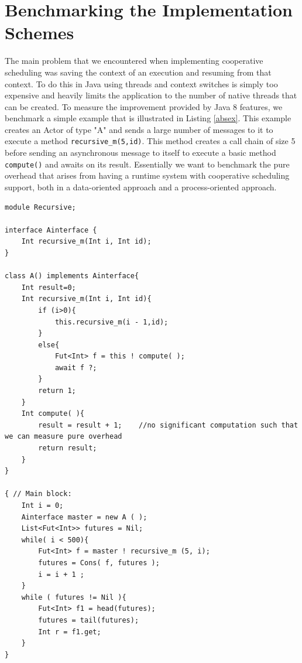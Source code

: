 \section{Benchmarking the Implementation Schemes}
\label{bench}
The main problem that we encountered when implementing cooperative scheduling was saving the context of an execution and resuming from that context. To do this in Java using threads and context switches is simply too expensive and heavily limits the application to the number of native threads that can be created. To measure the improvement provided by Java 8 features, we benchmark a simple example that is illustrated in Listing \ref{absex}. This example creates an Actor of type "A" and sends a large number of messages to it to execute a method \lstinline|recursive_m(5,id)|. This method creates a call chain of size 5 before sending an asynchronous message to itself to execute a basic method \lstinline|compute()| and awaits on its result. Essentially we want to benchmark the pure overhead that arises from having a runtime system with cooperative scheduling support, both in a data-oriented approach and a process-oriented approach.




\begin{lstlisting}[caption= ABS Example, label=absex]
module Recursive;

interface Ainterface {
	Int recursive_m(Int i, Int id);
}

class A() implements Ainterface{
	Int result=0;
	Int recursive_m(Int i, Int id){
		if (i>0){
			this.recursive_m(i - 1,id);	
		}
		else{
			Fut<Int> f = this ! compute( );
			await f ?;
		}
		return 1;
	}
	Int compute( ){
		result = result + 1;	//no significant computation such that we can measure pure overhead
		return result;
	}
}

{ // Main block:
	Int i = 0;	
	Ainterface master = new A ( );
	List<Fut<Int>> futures = Nil;	
	while( i < 500){		
		Fut<Int> f = master ! recursive_m (5, i);
		futures = Cons( f, futures );
		i = i + 1 ;
	}
	while ( futures != Nil ){
		Fut<Int> f1 = head(futures);
		futures = tail(futures);
		Int r = f1.get;
	}
}
\end{lstlisting}


